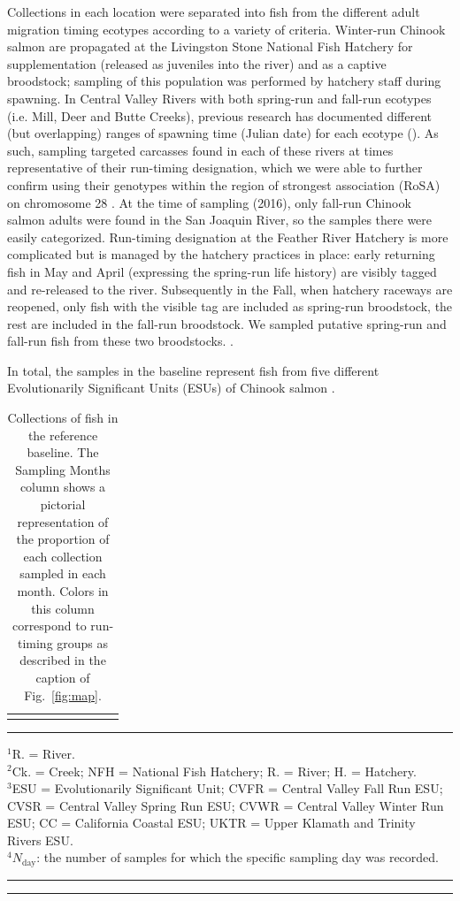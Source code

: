 Collections in each location were separated into fish from the different adult migration timing ecotypes according
to a variety of criteria.  Winter-run Chinook salmon are propagated at the Livingston
Stone National Fish Hatchery for supplementation (released as juveniles into the river) and as a captive broodstock;
sampling of this population was performed by hatchery staff during spawning. In Central Valley Rivers with both 
spring-run and fall-run ecotypes (i.e. Mill, Deer and Butte Creeks), previous research has documented different  (but overlapping) ranges of spawning time (Julian date) for each ecotype ().  As such, sampling targeted carcasses found in each of these 
rivers at times representative of their run-timing designation, which we were able to further confirm using their genotypes
within the region of strongest association (RoSA) on chromosome 28 \citep{thompson2020complex}. At the time of sampling (2016), only
fall-run Chinook salmon adults were found in the San Joaquin River, so the samples there were
easily categorized. Run-timing 
designation at the Feather River Hatchery is more complicated but is managed by the hatchery practices in place: 
early returning fish in May and April (expressing the spring-run life history) are visibly tagged and re-released 
to the river. Subsequently in the Fall, when hatchery raceways are reopened, only fish with the visible tag are included
as spring-run broodstock, the rest are included in the fall-run broodstock. We sampled putative spring-run and fall-run fish from these two broodstocks.  .



In total, the samples in the baseline represent fish from five different Evolutionarily Significant 
Units (ESUs) of Chinook salmon \citep{waples1991pacific}.
\begin{table}
\caption{\footnotesize Collections of fish in the reference baseline.  The Sampling Months column shows
a pictorial representation of the proportion of each collection sampled in each month.  Colors in
this column correspond to run-timing groups as described in the caption of Fig.~\protect\ref{fig:map}.}
\label{tab:samples}
{\footnotesize 
\begin{tabular*}{\linewidth}{@{\extracolsep{\fill}} llllllrcr}
\hline\hline\vspace*{0.4ex}

\end{tabular*}
}
\rule{3cm}{0.3pt}

{\footnotesize
$^1$R. = River.\\
$^2$Ck. = Creek; NFH = National Fish Hatchery; R. = River; H. = Hatchery.\\
$^3$ESU = Evolutionarily Significant Unit; CVFR = Central Valley Fall Run ESU; CVSR = Central Valley Spring Run ESU; CVWR = 
Central Valley Winter Run ESU; CC = California Coastal ESU; UKTR = Upper Klamath and Trinity Rivers ESU. \\
$^4N_\mathrm{day}$: the number of samples for which the specific sampling day was recorded.
}
\hrule\vspace*{0.3ex}\hrule
\end{table}

